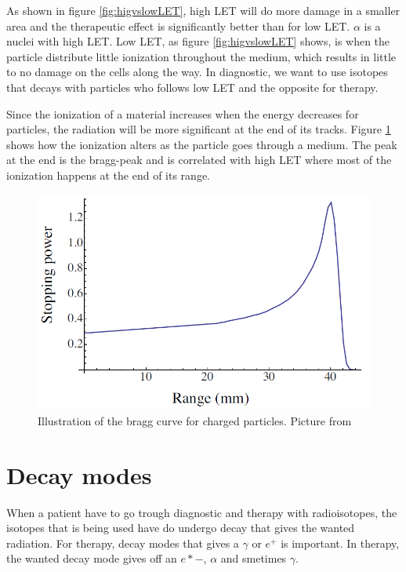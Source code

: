 \documentclass[twoside,english]{uiofysmaster/uiofysmaster}
\begin{document}
As shown in figure \ref{fig:higvslowLET}, high LET will do more damage in a smaller area and the therapeutic effect is significantly better than for low LET. $\alpha$ is a nuclei with high LET. 
Low LET, as figure \ref{fig:higvslowLET} shows, is when the particle distribute little ionization throughout the medium, which results in little to no damage on the cells along the way. In diagnostic, we want to use isotopes that decays with particles who follows low LET and the opposite for therapy.

Since the ionization of a material increases when the energy decreases for particles\cite{Nuclear_medicine}, the radiation will be more significant at the end of its tracks. Figure \ref{fig:braggcurve} shows how the ionization alters as the particle goes through a medium. The peak at the end is the bragg-peak and is correlated with high LET where most of the ionization happens at the end of its range. 

\begin{figure}[h!]
    \centering
    \includegraphics[scale=.25]{bragg.png}
    \caption{Illustration of the bragg curve for charged particles. Picture from \cite{inbook}}
    \label{fig:braggcurve}
\end{figure}


 
\section{Decay modes}
\label{sec:decaymodes}

When a patient have to go trough diagnostic and therapy with radioisotopes, the isotopes that is being used have do undergo decay that gives the wanted radiation. For therapy, decay modes  that gives a $\gamma$ or $e^{+}$ is important. In therapy, the wanted decay mode gives off an $e*{-}$, $\alpha$ and smetimes $\gamma$.
\end{document}
